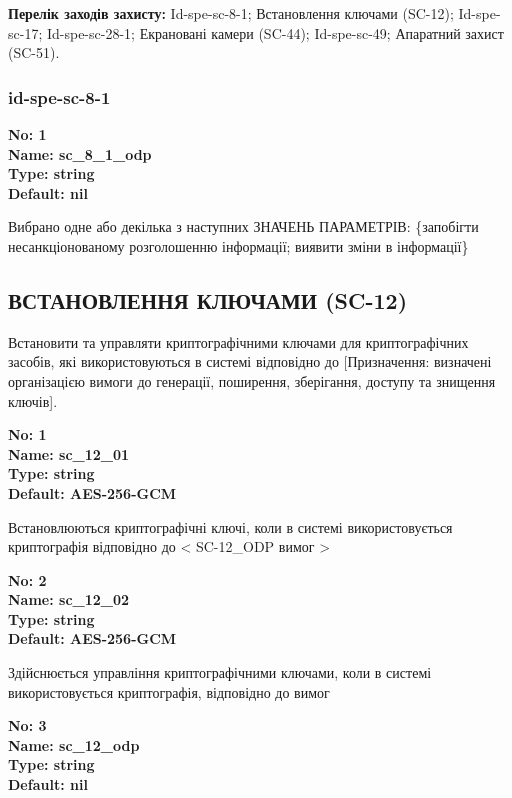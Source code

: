 \documentclass{article}
\begin{document}
\textbf{Перелік заходів захисту:} Id-spe-sc-8-1; Встановлення ключами (SC-12); Id-spe-sc-17; Id-spe-sc-28-1; Екрановані камери (SC-44); Id-spe-sc-49; Апаратний захист (SC-51).

\subsubsection{id-spe-sc-8-1}


\vspace{10pt}
{\footnotesize\bfseries
No: 1\\
Name: sc\_\allowbreak{}8\_\allowbreak{}1\_\allowbreak{}odp\\
Type: string\\
Default: nil
}

{\footnotesize Вибрано одне або декілька з наступних ЗНАЧЕНЬ ПАРАМЕТРІВ: \{запобігти несанкціонованому розголошенню інформації; виявити зміни в інформації\}}




\subsection{ВСТАНОВЛЕННЯ КЛЮЧАМИ (SC-12)}
Встановити та управляти криптографічними ключами для криптографічних засобів, які використовуються в системі відповідно до [Призначення: визначені організацією вимоги до генерації, поширення, зберігання, доступу та знищення ключів].

\vspace{10pt}
{\footnotesize\bfseries
No: 1\\
Name: sc\_\allowbreak{}12\_\allowbreak{}01\\
Type: string\\
Default: \textquotedbl{}AES-256-GCM\textquotedbl{}
}

{\footnotesize Встановлюються криптографічні ключі, коли в системі використовується криптографія відповідно до < SC-12\_\allowbreak{}ODP вимог >}


{\footnotesize\bfseries
No: 2\\
Name: sc\_\allowbreak{}12\_\allowbreak{}02\\
Type: string\\
Default: \textquotedbl{}AES-256-GCM\textquotedbl{}
}

{\footnotesize Здійснюється управління криптографічними ключами, коли в системі використовується криптографія, відповідно до вимог }


{\footnotesize\bfseries
No: 3\\
Name: sc\_\allowbreak{}12\_\allowbreak{}odp\\
Type: string\\
Default: nil
}
\end{document}
